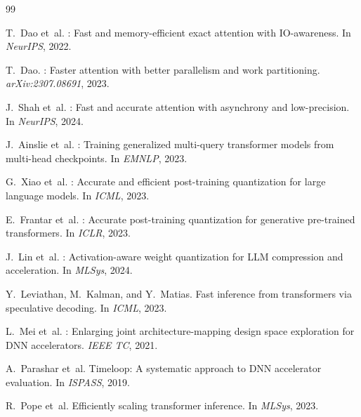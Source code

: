 \documentclass[sigconf,10pt]{acmart}
\begin{document}
\begin{thebibliography}{99}

T.~Dao et~al.
: Fast and memory-efficient exact attention with
  {IO}-awareness.
\newblock In \emph{NeurIPS}, 2022.

T.~Dao.
: Faster attention with better parallelism and work
  partitioning.
\newblock \emph{arXiv:2307.08691}, 2023.

J.~Shah et~al.
: Fast and accurate attention with asynchrony and
  low-precision.
\newblock In \emph{NeurIPS}, 2024.

J.~Ainslie et~al.
: Training generalized multi-query transformer models from
  multi-head checkpoints.
\newblock In \emph{EMNLP}, 2023.


G.~Xiao et~al.
: Accurate and efficient post-training quantization for
  large language models.
\newblock In \emph{ICML}, 2023.

E.~Frantar et~al.
: Accurate post-training quantization for generative
  pre-trained transformers.
\newblock In \emph{ICLR}, 2023.

J.~Lin et~al.
: Activation-aware weight quantization for {LLM} compression
  and acceleration.
\newblock In \emph{MLSys}, 2024.


Y.~Leviathan, M.~Kalman, and Y.~Matias.
\newblock Fast inference from transformers via speculative decoding.
\newblock In \emph{ICML}, 2023.


L.~Mei et~al.
: Enlarging joint architecture-mapping design space
  exploration for {DNN} accelerators.
\newblock \emph{IEEE TC}, 2021.

A.~Parashar et~al.
\newblock Timeloop: A systematic approach to {DNN} accelerator evaluation.
\newblock In \emph{ISPASS}, 2019.


R.~Pope et~al.
\newblock Efficiently scaling transformer inference.
\newblock In \emph{MLSys}, 2023.


\end{thebibliography}
\end{document}
